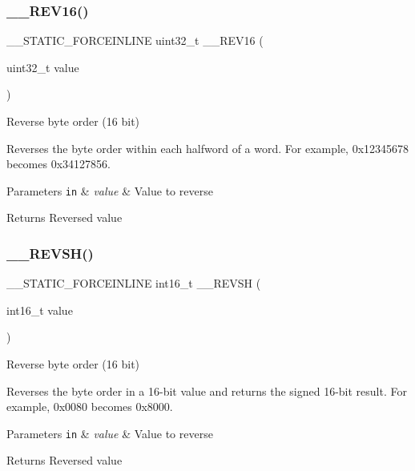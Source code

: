 \subsubsection{\texorpdfstring{\+\_\+\+\_\+\+R\+E\+V16()}{\_\_REV16()}}
{\footnotesize\ttfamily \+\_\+\+\_\+\+S\+T\+A\+T\+I\+C\+\_\+\+F\+O\+R\+C\+E\+I\+N\+L\+I\+NE uint32\+\_\+t \+\_\+\+\_\+\+R\+E\+V16 (\begin{DoxyParamCaption}\item[{uint32\+\_\+t}]{value }\end{DoxyParamCaption})}



Reverse byte order (16 bit) 

Reverses the byte order within each halfword of a word. For example, 0x12345678 becomes 0x34127856. 
\begin{DoxyParams}[1]{Parameters}
\mbox{\tt in}  & {\em value} & Value to reverse \\
\hline
\end{DoxyParams}
\begin{DoxyReturn}{Returns}
Reversed value 
\end{DoxyReturn}
\mbox{\label{group___c_m_s_i_s___core___instruction_interface_gacb695341318226a5f69ed508166622ac}} 
\subsubsection{\texorpdfstring{\+\_\+\+\_\+\+R\+E\+V\+S\+H()}{\_\_REVSH()}}
{\footnotesize\ttfamily \+\_\+\+\_\+\+S\+T\+A\+T\+I\+C\+\_\+\+F\+O\+R\+C\+E\+I\+N\+L\+I\+NE int16\+\_\+t \+\_\+\+\_\+\+R\+E\+V\+SH (\begin{DoxyParamCaption}\item[{int16\+\_\+t}]{value }\end{DoxyParamCaption})}



Reverse byte order (16 bit) 

Reverses the byte order in a 16-\/bit value and returns the signed 16-\/bit result. For example, 0x0080 becomes 0x8000. 
\begin{DoxyParams}[1]{Parameters}
\mbox{\tt in}  & {\em value} & Value to reverse \\
\hline
\end{DoxyParams}
\begin{DoxyReturn}{Returns}
Reversed value 
\end{DoxyReturn}
\mbox{\label{group___c_m_s_i_s___core___instruction_interface_gab16acb6456176f1e87a4f2724c2b6028}} 
